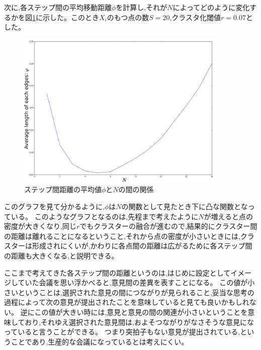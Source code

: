 次に,各ステップ間の平均移動距離$\phi$を計算し,それが$N$によってどのように変化するかを図\ref{fig:f24}に示した。このとき$X_{i}$のもつ点の数$S=20$,クラスタ化閾値$r=0.07$とした。
\begin{figure}[H]
    \begin{center}
        \includegraphics[width=10cm]{../img/N_l_2.png}
        \caption{ステップ間距離の平均値$\phi$と$N$の間の関係}
        \label{fig:f24}
    \end{center}
\end{figure}
このグラフを見て分かるように,$\phi$は$N$の関数として見たとき下に凸な関数となっている。
このようなグラフとなるのは,先程まで考えたように$N$が増えると点の密度が大きくなり,同じ$r$でもクラスターの融合が進むので,結果的にクラスター間の距離は離れることになるということ,それから点の密度が小さいときには,クラスターは形成されにくいが,かわりに各点間の距離は広がるために各ステップ間の距離も大きくなる,と説明できる。

ここまで考えてきた各ステップ間の距離というのは,はじめに設定としてイメージしていた会議を思い浮かべると,意見間の差異を表すことになる。
この値が小さいということは,選択された意見の間につながりが見られること,妥当な思考の過程によって次の意見が提出されたことを意味していると見ても良いかもしれない。
逆にこの値が大きい時には,意見と意見の間の関連が小さいということを意味しており,それゆえ選択された意見間は,およそつながりがなさそうな意見になっていると言うことができる。
つまり突拍子もない意見が提出されている,ということであり,生産的な会議になっているとは考えにくい。

